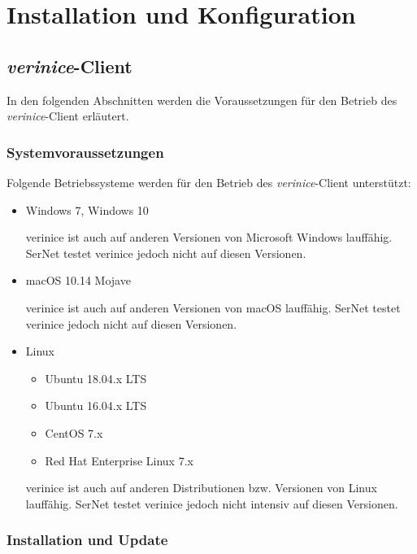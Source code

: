 \documentclass[a4paper,10pt]{book}
\begin{document}
\newpage


\chapter{Installation und Konfiguration}

\section{\textit{verinice}-Client}

In den folgenden Abschnitten werden die Voraussetzungen für den Betrieb des
\textit{verinice}-Client erläutert.

\subsection{Systemvoraussetzungen}

Folgende Betriebssysteme werden für den Betrieb des \textit{verinice}-Client
unterstützt:

\begin{itemize}
  \item Windows 7, Windows 10

    verinice ist auch auf anderen Versionen von Microsoft Windows lauffähig.
    SerNet testet verinice jedoch nicht auf diesen Versionen.

  \item macOS 10.14 Mojave

    verinice ist auch auf anderen Versionen von macOS lauffähig. SerNet
    testet verinice jedoch nicht auf diesen Versionen.

  \item Linux
    \begin{itemize}
      \item Ubuntu 18.04.x LTS
      \item Ubuntu 16.04.x LTS
      \item CentOS 7.x
      \item Red Hat Enterprise Linux 7.x
    \end{itemize}

    verinice ist auch auf anderen Distributionen bzw. Versionen von Linux
    lauffähig. SerNet testet verinice jedoch nicht intensiv
    auf diesen Versionen.
\end{itemize}

\subsection{Installation und Update}
\label{sec:installation}
\end{document}
